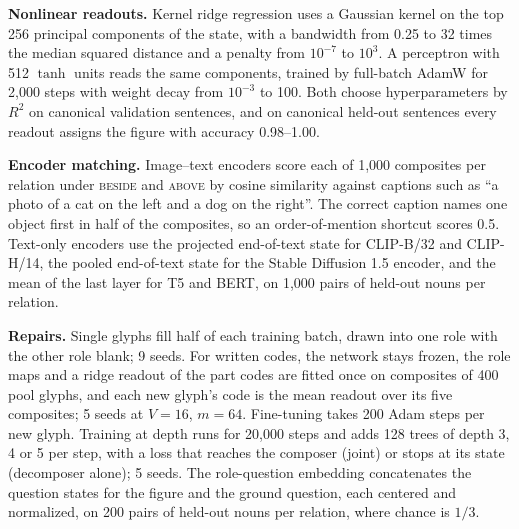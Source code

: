 \documentclass[10pt]{article}
\theoremstyle{plain}
\theoremstyle{remark}
\begin{document}
\textbf{Nonlinear readouts.}\label{app:e19} Kernel ridge regression uses a Gaussian kernel on the top 256 principal components of the state, with a bandwidth from 0.25 to 32 times the median squared distance and a penalty from $10^{-7}$ to $10^{3}$. A perceptron with 512 $\tanh$ units reads the same components, trained by full-batch AdamW for 2{,}000 steps with weight decay from $10^{-3}$ to 100. Both choose hyperparameters by $R^2$ on canonical validation sentences, and on canonical held-out sentences every readout assigns the figure with accuracy 0.98--1.00.

\textbf{Encoder matching.} Image--text encoders score each of 1{,}000 composites per relation under \textsc{beside} and \textsc{above} by cosine similarity against captions such as ``a photo of a cat on the left and a dog on the right''. The correct caption names one object first in half of the composites, so an order-of-mention shortcut scores 0.5. Text-only encoders use the projected end-of-text state for CLIP-B/32 and CLIP-H/14, the pooled end-of-text state for the Stable Diffusion 1.5 encoder, and the mean of the last layer for T5 and BERT, on 1{,}000 pairs of held-out nouns per relation.

\textbf{Repairs.} Single glyphs fill half of each training batch, drawn into one role with the other role blank; 9 seeds. For written codes, the network stays frozen, the role maps and a ridge readout of the part codes are fitted once on composites of 400 pool glyphs, and each new glyph's code is the mean readout over its five composites; 5 seeds at $V = 16$, $m = 64$. Fine-tuning takes 200 Adam steps per new glyph. Training at depth runs for 20{,}000 steps and adds 128 trees of depth 3, 4 or 5 per step, with a loss that reaches the composer (joint) or stops at its state (decomposer alone); 5 seeds. The role-question embedding concatenates the question states for the figure and the ground question, each centered and normalized, on 200 pairs of held-out nouns per relation, where chance is $1/3$.
\end{document}
